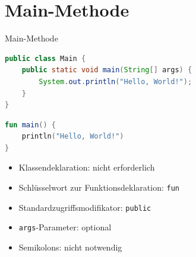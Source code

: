 \documentclass{beamer}
\begin{document}
\section{Main-Methode}
\begin{frame}[fragile]{Main-Methode}
  \begin{lstlisting}[language=Java, title=Java Main-Methode, xleftmargin=1em]
public class Main {
    public static void main(String[] args) {
        System.out.println("Hello, World!");
    }
}
  \end{lstlisting}
  \pause\begin{lstlisting}[language=Kotlin, title=Kotlin Main-Methode, xleftmargin=1em]
fun main() {
    println("Hello, World!")
}
  \end{lstlisting}
  \pause[\thebeamerpauses]\begin{itemize}[<+->]
      \item Klassendeklaration: nicht erforderlich %
      \item Schlüsselwort zur Funktionsdeklaration: \texttt{fun}
      \item Standardzugriffsmodifikator: \texttt{public}
      \item \texttt{args}-Parameter: optional
      \item Semikolons: nicht notwendig
    \end{itemize}
    \vspace{1cm}
\end{frame}
\end{document}
